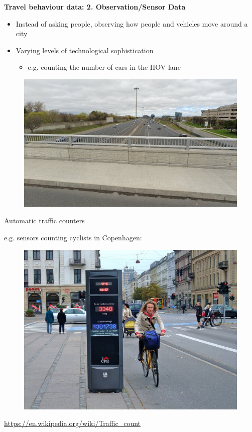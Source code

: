 \documentclass[aspectratio=169]{beamer}
\begin{document}
\begin{frame}
	
	\textbf{Travel behaviour data: 2. Observation/Sensor Data}
	
	\begin{itemize}
		\item Instead of asking people, observing how people and vehicles move around a city
		\item Varying levels of technological sophistication
		
		\begin{itemize}
			\item e.g. counting the number of cars in the HOV lane
		\end{itemize}
		
	\end{itemize}
	
	\begin{figure}
		\centering
		\includegraphics[width=0.7\linewidth]{images/404_bridge.png}
	\end{figure}
	 
\end{frame}









\begin{frame}
	
	Automatic traffic counters
	\vspace{2mm}
	
	e.g. sensors counting cyclists in Copenhagen:
	
	\begin{figure}
		\centering
		\includegraphics[width=0.7\linewidth]{images/bike_counter_copenhagen}
	\end{figure}
	
	\tiny\url{https://en.wikipedia.org/wiki/Traffic_count}
	
\end{frame}
\end{document}
